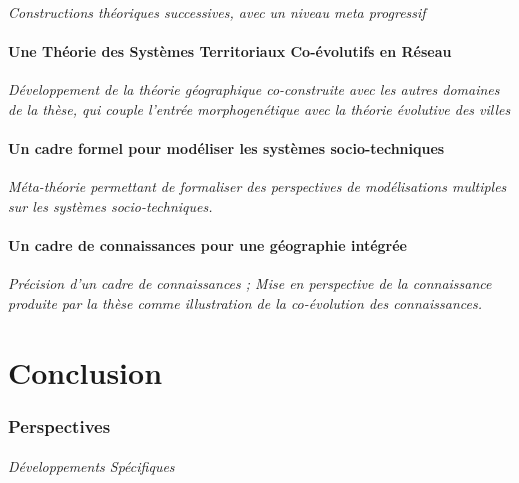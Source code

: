 \textit{Constructions théoriques successives, avec un niveau meta progressif}

\subsection{Une Théorie des Systèmes Territoriaux Co-évolutifs en Réseau}

\textit{Développement de la théorie géographique co-construite avec les autres domaines de la thèse, qui couple l'entrée morphogenétique avec la théorie évolutive des villes}


\subsection{Un cadre formel pour modéliser les systèmes socio-techniques}

\textit{Méta-théorie permettant de formaliser des perspectives de modélisations multiples sur les systèmes socio-techniques.}




\subsection{Un cadre de connaissances pour une géographie intégrée}

\textit{Précision d'un cadre de connaissances ; Mise en perspective de la connaissance produite par la thèse comme illustration de la co-évolution des connaissances.}



\part*{Conclusion}


\section*{Perspectives}

\paragraph{Développements Spécifiques}

